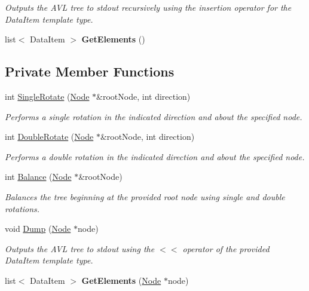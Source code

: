 \begin{DoxyCompactItemize}
\begin{DoxyCompactList}\small\item\em Outputs the A\-V\-L tree to stdout recursively using the insertion operator for the Data\-Item template type. \end{DoxyCompactList}\item 
\hypertarget{classAVLTree_a501149b97428fd09771c4dffc2d5d932}{list$<$ Data\-Item $>$ {\bfseries Get\-Elements} ()}\label{classAVLTree_a501149b97428fd09771c4dffc2d5d932}

\end{DoxyCompactItemize}
\subsection*{Private Member Functions}
\begin{DoxyCompactItemize}
\item 
int \hyperlink{classAVLTree_ac7ebd1be164c8e1d0eab990e14285957}{Single\-Rotate} (\hyperlink{structAVLTree_1_1Node}{Node} $\ast$\&root\-Node, int direction)
\begin{DoxyCompactList}\small\item\em Performs a single rotation in the indicated direction and about the specified node. \end{DoxyCompactList}\item 
int \hyperlink{classAVLTree_a7e2ed1a8d70f97fc9d4de6d9da4eb729}{Double\-Rotate} (\hyperlink{structAVLTree_1_1Node}{Node} $\ast$\&root\-Node, int direction)
\begin{DoxyCompactList}\small\item\em Performs a double rotation in the indicated direction and about the specified node. \end{DoxyCompactList}\item 
int \hyperlink{classAVLTree_aabcb2e90d12bcb172f728692bce7e7be}{Balance} (\hyperlink{structAVLTree_1_1Node}{Node} $\ast$\&root\-Node)
\begin{DoxyCompactList}\small\item\em Balances the tree beginning at the provided root node using single and double rotations. \end{DoxyCompactList}\item 
void \hyperlink{classAVLTree_aeafa2839058227c9a076d56d7929ebf7}{Dump} (\hyperlink{structAVLTree_1_1Node}{Node} $\ast$node)
\begin{DoxyCompactList}\small\item\em Outputs the A\-V\-L tree to stdout using the $<$$<$ operator of the provided Data\-Item template type. \end{DoxyCompactList}\item 
\hypertarget{classAVLTree_ad02b6a7bd1582dba503d48a8b960d902}{list$<$ Data\-Item $>$ {\bfseries Get\-Elements} (\hyperlink{structAVLTree_1_1Node}{Node} $\ast$node)}\label{classAVLTree_ad02b6a7bd1582dba503d48a8b960d902}


\end{DoxyCompactItemize}
